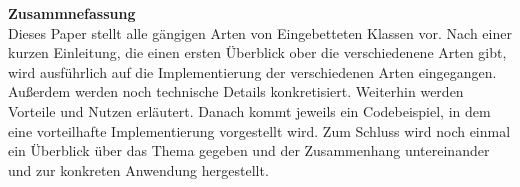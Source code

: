 \vspace*{2cm}
{\bf\Large Zusammnefassung} \\ [1em]
Dieses Paper stellt alle gängigen Arten von Eingebetteten Klassen vor.
Nach einer kurzen Einleitung, die einen ersten Überblick ober die verschiedenene Arten gibt, wird ausführlich auf die Implementierung  der verschiedenen Arten eingegangen.
Außerdem werden noch technische Details konkretisiert. Weiterhin werden Vorteile und Nutzen erläutert.
Danach kommt jeweils ein Codebeispiel, in dem eine vorteilhafte Implementierung vorgestellt wird.
Zum Schluss wird noch einmal ein Überblick über das Thema gegeben und der Zusammenhang untereinander und zur konkreten Anwendung hergestellt.

\clearpage
